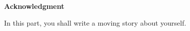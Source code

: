\begingroup
	\pagestyle{plain}
	
	
	\begin{center}
		\Large{\textbf{Acknowledgment}}
	\end{center}

\noindent In this part, you shall write a moving story about yourself. 

\lipsum[1]

	\forcedoublepage
\endgroup

\pagestyle{plain}







